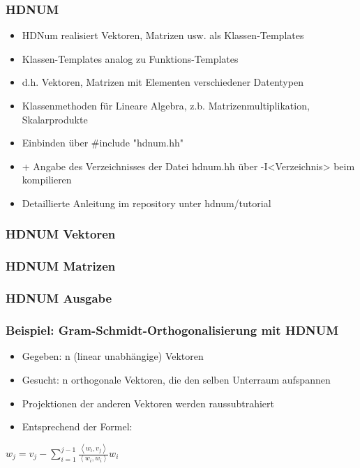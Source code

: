 \documentclass[ignorenonframetext,12pt]{beamer}
\theoremstyle{definition}
\theoremstyle{definition}
\begin{document}
\begin{frame}[fragile]
\frametitle{HDNUM}
\begin{itemize}
\item HDNum realisiert Vektoren, Matrizen usw. als Klassen-Templates
\item Klassen-Templates analog zu Funktions-Templates
\item d.h. Vektoren, Matrizen mit Elementen verschiedener Datentypen
\item Klassenmethoden für Lineare Algebra, z.b. Matrizenmultiplikation, Skalarprodukte
\item Einbinden über \#include "hdnum.hh"
\item + Angabe des Verzeichnisses der Datei hdnum.hh über -I<Verzeichnis> beim kompilieren
\item Detaillierte Anleitung im repository unter hdnum/tutorial
\end{itemize}
\end{frame}

\begin{frame}[fragile]
\frametitle{HDNUM Vektoren}

\end{frame}

\begin{frame}[fragile]
\frametitle{HDNUM Matrizen}

\end{frame}

\begin{frame}[fragile]
\frametitle{HDNUM Ausgabe}

\end{frame}


\begin{frame}[fragile]
\frametitle{Beispiel: Gram-Schmidt-Orthogonalisierung mit HDNUM}
\begin{itemize}
\item Gegeben: n (linear unabhängige) Vektoren
\item Gesucht: n orthogonale Vektoren, die den selben Unterraum aufspannen
\item Projektionen der anderen Vektoren werden raussubtrahiert
\item Entsprechend der Formel:


\end{itemize}
\large
\centering
\vspace{0.5cm}
\hspace{2cm}
$ w_{j}=v_{j}-\sum_{i=1}^{j-1} \frac{\left\langle w_{i}, v_{j}\right\rangle}{\left\langle w_{i}, w_{i}\right\rangle} w_{i}$
\end{frame}
\end{document}
